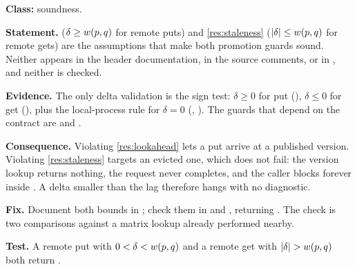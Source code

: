 \begin{deviation}\label{dev:lookahead-uncheck}
\textbf{Class:} soundness.

\textbf{Statement.}  ($\delta \ge w(p,q)$ for remote
puts) and \cref{res:staleness} ($|\delta| \le w(p,q)$ for remote \glspl{get})
are the assumptions that make both promotion guards sound. Neither appears in
the header documentation, in the source comments, or in \cite{dstm2026}, and
neither is checked.

\textbf{Evidence.} The only \gls{delta} validation is the sign test:
$\delta \ge 0$ for put (), $\delta \le 0$ for get
(), plus the local-process rule for $\delta = 0$
(, ). The guards that depend on the
contract are  and .

\textbf{Consequence.} Violating \cref{res:lookahead} lets a put arrive at a
published \gls{version}. Violating \cref{res:staleness} targets an evicted
one, which does not fail: the version lookup returns nothing, the request
never completes, and the caller blocks forever inside . A
\gls{delta} smaller than the \gls{lag} therefore hangs with no
diagnostic.

\textbf{Fix.} Document both bounds in ; check them in
 and , returning . The check
is two comparisons against a matrix lookup already performed nearby.

\textbf{Test.} A remote put with $0 < \delta < w(p,q)$ and a remote get
with $|\delta| > w(p,q)$ both return .
\end{deviation}

